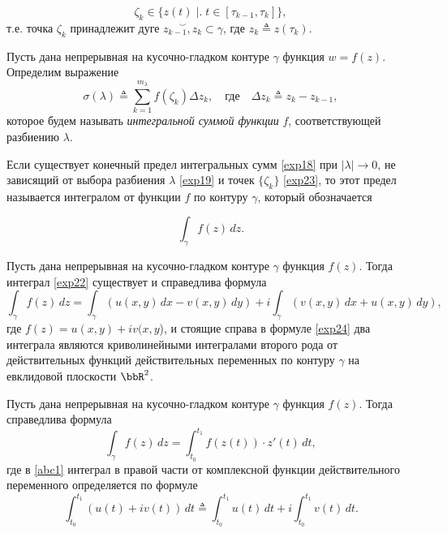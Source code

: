 \begin{equation}
\label{exp23}
\zeta_k \in \{z(t)\; \bigr|\bigl.\; t \in [\tau_{k-1},\tau_k]\},
\end{equation}
т.е. точка $\zeta_k$ принадлежит дуге $\stackrel{\smile}{z_{k-1}, z_k} \subset \gamma$, где $z_k \triangleq z(\tau_k)$.

\begin{defn}
\label{omg}
Пусть дана непрерывная на кусочно-гладком контуре $\gamma$ функция $w=f(z)$. Определим выражение
\begin{equation}
\label{exp18}
\sigma(\lambda) \triangleq \sum\limits_{k=1}^{m_{\lambda}} f(\zeta_k)\Delta z_k, \quad\text{где}\quad \Delta z_k \triangleq z_k - z_{k-1},
\end{equation}
которое будем называть \textit{интегральной суммой функции} $f$, соответствующей разбиению $\lambda$.
\end{defn}

Если существует конечный предел интегральных сумм \eqref{exp18} при $|\lambda| \to 0$, не зависящий от выбора разбиения $\lambda$ \eqref{exp19} и точек $\{\zeta_k\}$ \eqref{exp23}, то этот предел называется интегралом от функции $f$ по контуру $\gamma$, который обозначается

\begin{equation}
\label{exp22}
\int_\gamma f(z)\,dz.
\end{equation}

\begin{thm}
\label{exp21}
Пусть дана непрерывная на кусочно-гладком контуре $\gamma$ функция $f(z)$. Тогда интеграл \eqref{exp22} существует и справедлива формула
\begin{equation}
\label{exp24}
\int _\gamma f(z) \,dz = \int _\gamma(u(x,y)\,dx - v(x,y)\,dy)+i\int_\gamma (v(x,y)\,dx +u(x,y)\,dy),
\end{equation}
где $f(z) = u(x, y)+ iv(x, y$), и стоящие справа в формуле \eqref{exp24} два интеграла являются криволинейными интегралами второго рода от действительных функций действительных переменных по контуру $\gamma$ на евклидовой плоскости $\bbR^2$.
\end{thm}


\begin{cons}
Пусть дана непрерывная на кусочно-гладком контуре $\gamma$ функция $f(z)$. Тогда справедлива формула 
\begin{equation}
\label{abc1}
\int _\gamma f(z) \,dz = \int _{t_0}^{t_1} f(z(t))\cdot z'(t) \,dt,
\end{equation}
где в \eqref{abc1} интеграл в правой части от комплексной функции действительного переменного определяется по формуле
\begin{equation}
\label{kek2}
\int _{t_0}^{t_1}(u(t)+iv(t)) \,dt \triangleq \int _{t_0}^{t_1}u(t) \,dt + i \int _{t_0}^{t_1}v(t) \,dt.
\end{equation}
\end{cons}

